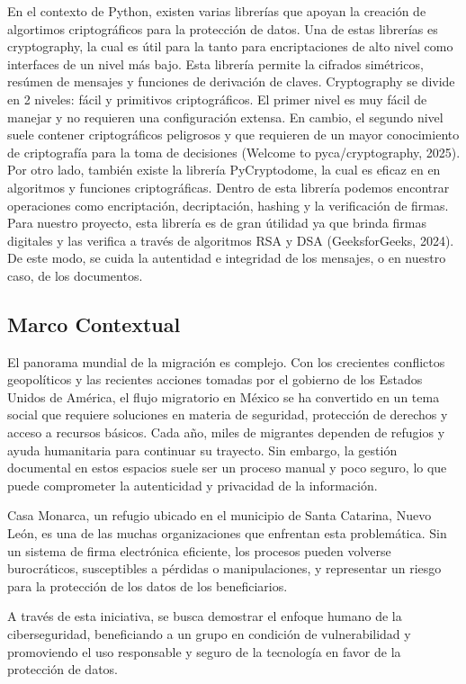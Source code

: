 \documentclass{amsart}
\begin{document}
    En el contexto de Python, existen varias librerías que apoyan la creación de algortimos criptográficos para la protección de datos. Una de estas librerías es cryptography, la cual es útil para la tanto para encriptaciones de alto nivel como interfaces de un nivel más bajo. Esta librería permite la cifrados simétricos, resúmen de mensajes y funciones de derivación de claves. Cryptography se divide en 2 niveles: fácil y primitivos criptográficos. El primer nivel es muy fácil de manejar y no requieren una configuración extensa. En cambio, el segundo nivel suele contener criptográficos peligrosos y que requieren de un mayor conocimiento de criptografía para la toma de decisiones (Welcome to pyca/cryptography, 2025).
	Por otro lado, también existe la librería PyCryptodome, la cual es eficaz en en algoritmos y funciones criptográficas. Dentro de esta librería podemos encontrar operaciones como encriptación, decriptación, hashing y la verificación de firmas. Para nuestro proyecto, esta librería es de gran útilidad ya que brinda firmas digitales y las verifica a través de algoritmos RSA y DSA (GeeksforGeeks, 2024). De este modo, se cuida la autentidad e integridad de los mensajes, o en nuestro caso, de los documentos. 

    \subsection{Marco Contextual}
    El panorama mundial de la migración es complejo. Con los crecientes conflictos geopolíticos y las recientes acciones tomadas por el gobierno de los Estados Unidos de América, el flujo migratorio en México se ha convertido en un tema social que requiere soluciones en materia de seguridad, protección de derechos y acceso a recursos básicos. Cada año, miles de migrantes dependen de refugios y ayuda humanitaria para continuar su trayecto. Sin embargo, la gestión documental en estos espacios suele ser un proceso manual y poco seguro, lo que puede comprometer la autenticidad y privacidad de la información.


    Casa Monarca, un refugio ubicado en el municipio de Santa Catarina, Nuevo León, es una de las muchas organizaciones que enfrentan esta problemática. Sin un sistema de firma electrónica eficiente, los procesos pueden volverse burocráticos, susceptibles a pérdidas o manipulaciones, y representar un riesgo para la protección de los datos de los beneficiarios.


    A través de esta iniciativa, se busca demostrar el enfoque humano de la ciberseguridad, beneficiando a un grupo en condición de vulnerabilidad y promoviendo el uso responsable y seguro de la tecnología en favor de la protección de datos.
        
\end{document}
